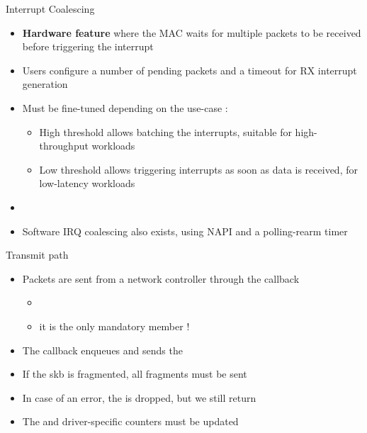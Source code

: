 \begin{frame}{Interrupt Coalescing}
	\begin{itemize}
		\item \textbf{Hardware feature} where the MAC waits for multiple packets to be received before triggering the interrupt
		\item Users configure a number of pending packets and a timeout for RX interrupt generation
		\item Must be fine-tuned depending on the use-case :
			\begin{itemize}
				\item High threshold allows batching the interrupts, suitable for high-throughput workloads
				\item Low threshold allows triggering interrupts as soon as data is received, for low-latency workloads
			\end{itemize}
		\item {}
		\item Software IRQ coalescing also exists, using NAPI and a polling-rearm timer
	\end{itemize}
\end{frame}

\begin{frame}{Transmit path}
	\begin{itemize}
		\item Packets are sent from a network controller through the  callback
			\begin{itemize}
				\item {}
				\item it is the only mandatory  member !
			\end{itemize}
		\item The  callback enqueues and sends the 
		\item If the skb is fragmented, all fragments must be sent
		\item In case of an error, the  is dropped, but we still return 
		\item The  and driver-specific counters must be updated
	\end{itemize}
\end{frame}

